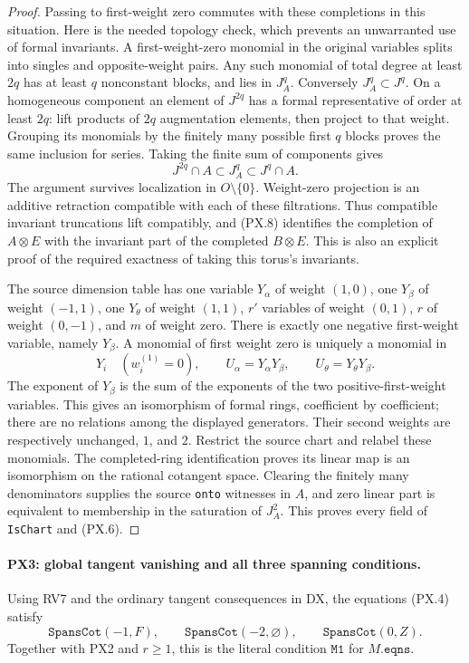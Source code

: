 \begin{proof}
Passing to first-weight zero commutes with these completions
in this situation.  Here is the needed topology check,
which prevents an unwarranted use of formal invariants.
A first-weight-zero monomial in the original variables
splits into singles and opposite-weight pairs.  Any such
monomial of total degree at least $2q$ has at least $q$
nonconstant blocks, and lies in $J_A^q$.  Conversely
$J_A^q\subset J^q$.  On a homogeneous component an element
of $J^{2q}$ has a formal representative of order at least
$2q$: lift products of $2q$ augmentation elements, then
project to that weight.  Grouping its monomials by the
finitely many possible first $q$ blocks proves the same
inclusion for series.  Taking the finite sum of components
gives
\[
        J^{2q}\cap A\subset J_A^q\subset J^q\cap A.
 \tag{PX.8}
\]
The argument survives localization in $O\setminus\{0\}$.
Weight-zero projection is an additive retraction compatible
with each of these filtrations.  Thus compatible invariant
truncations lift compatibly, and (PX.8) identifies the
completion of $A\otimes E$ with the invariant part of the
completed $B\otimes E$.  This is also an explicit proof of
the required exactness of taking this torus's invariants.

The source dimension table has one variable $Y_\alpha$
of weight $(1,0)$, one $Y_\beta$ of weight $(-1,1)$,
one $Y_\theta$ of weight $(1,1)$, $r'$ variables of
weight $(0,1)$, $r$ of weight $(0,-1)$, and $m$ of
weight zero.  There is exactly one negative first-weight
variable, namely $Y_\beta$.  A monomial of first weight
zero is uniquely a monomial in
\[
 Y_i\quad(w_i^{(1)}=0),\qquad
 U_\alpha=Y_\alpha Y_\beta,\qquad
 U_\theta=Y_\theta Y_\beta.
 \tag{PX.9}
\]
The exponent of $Y_\beta$ is the sum of the exponents of
the two positive-first-weight variables.  This gives an
isomorphism of formal rings, coefficient by coefficient;
there are no relations among the displayed generators.
Their second weights are respectively unchanged, $1$, and
$2$.  Restrict the source chart and relabel these monomials.
The completed-ring identification proves its linear map is
an isomorphism on the rational cotangent space.  Clearing
the finitely many denominators supplies the source
\texttt{onto} witnesses in $A$, and zero linear part is
equivalent to membership in the saturation of $J_A^2$.
This proves every field of \texttt{IsChart} and (PX.6).
\end{proof}

\paragraph{PX3: global tangent vanishing and all three spanning conditions.}
\label{claim:PX3}
Using RV7 and the ordinary tangent consequences in DX, the
equations (PX.4) satisfy
\[
 \mathtt{SpansCot}(-1,F),\qquad
 \mathtt{SpansCot}(-2,\varnothing),\qquad
 \mathtt{SpansCot}(0,Z).
 \tag{PX.10}
\]
Together with PX2 and $r\ge1$, this is the literal condition
$\mathtt{M1}$ for $M.\mathtt{eqns}$.

